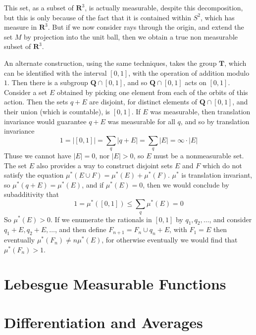 This set, as a subset of $\mathbf{R}^3$, is actually measurable, despite this decomposition, but this is only because of the fact that it is contained within $S^2$, which has measure in $\mathbf{R}^3$. But if we now consider rays through the origin, and extend the set $M$ by projection into the unit ball, then we obtain a true non measurable subset of $\mathbf{R}^3$.

An alternate construction, using the same techniques, takes the group $\mathbf{T}$, which can be identified with the interval $[0,1]$, with the operation of addition modulo $1$. Then there is a subgroup $\mathbf{Q} \cap [0,1]$, and so $\mathbf{Q} \cap [0,1]$ acts on $[0,1]$. Consider a set $E$ obtained by picking one element from each of the orbits of this action. Then the sets $q + E$ are disjoint, for distinct elements of $\mathbf{Q} \cap [0,1]$, and their union (which is countable), is $[0,1]$. If $E$ was measurable, then translation invariance would guarantee $q + E$ was measurable for all $q$, and so by translation invariance
%
\[ 1 = |[0,1]| = \sum_q |q + E| = \sum_q |E| = \infty \cdot |E| \]
%
Thuse we cannot have $|E| = 0$, nor $|E| > 0$, so $E$ must be a nonmeasurable set. The set $E$ also provides a way to construct disjoint sets $E$ and $F$ which do not satisfy the equation $\mu^*(E \cup F) = \mu^*(E) + \mu^*(F)$. $\mu^*$ is translation invariant, so $\mu^*(q + E) = \mu^*(E)$, and if $\mu^*(E) = 0$, then we would conclude by subadditivity that
%
\[ 1 = \mu^*([0,1]) \leq \sum_q \mu^*(E) = 0 \]
%
So $\mu^*(E) > 0$. If we enumerate the rationals in $[0,1]$ by $q_1, q_2, \dots$, and consider $q_1 + E, q_2 + E, \dots$, and then define $F_{n+1} = F_n \cup q_n + E$, with $F_1 = E$ then eventually $\mu^*(F_n) \neq n \mu^*(E)$, for otherwise eventually we would find that $\mu^*(F_n) > 1$.

\chapter{Lebesgue Measurable Functions}

\chapter{Differentiation and Averages}

%
%

